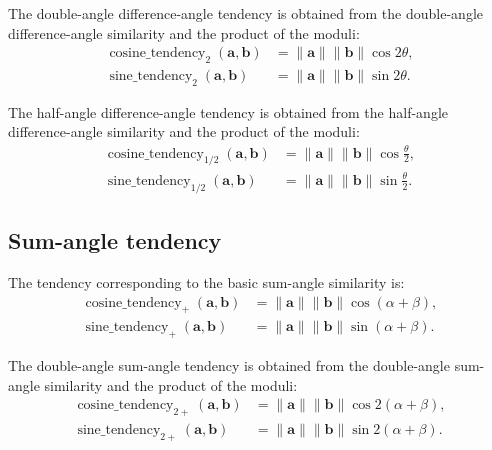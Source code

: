 \begin{definition}\label{def:double_diff_tendency}
The double-angle difference-angle tendency is obtained from the double-angle difference-angle similarity and the product of the moduli:
\begin{align*}
\operatorname{cosine\_tendency}_2(\mathbf{a}, \mathbf{b}) &= \|\mathbf{a}\| \|\mathbf{b}\| \cos 2\theta, \\
\operatorname{sine\_tendency}_2(\mathbf{a}, \mathbf{b}) &= \|\mathbf{a}\| \|\mathbf{b}\| \sin 2\theta.
\end{align*}
\end{definition}

\begin{definition}\label{def:half_diff_tendency}
The half-angle difference-angle tendency is obtained from the half-angle difference-angle similarity and the product of the moduli:
\begin{align*}
\operatorname{cosine\_tendency}_{1/2}(\mathbf{a}, \mathbf{b}) &= \|\mathbf{a}\| \|\mathbf{b}\| \cos\frac{\theta}{2}, \\
\operatorname{sine\_tendency}_{1/2}(\mathbf{a}, \mathbf{b}) &= \|\mathbf{a}\| \|\mathbf{b}\| \sin\frac{\theta}{2}.
\end{align*}
\end{definition}

\subsection{\texorpdfstring{Sum-angle tendency}{Sum-angle tendency}}

\begin{definition}\label{def:basic_sum_tendency}
The tendency corresponding to the basic sum-angle similarity is:
\begin{align*}
\operatorname{cosine\_tendency}_+(\mathbf{a}, \mathbf{b}) &= \|\mathbf{a}\| \|\mathbf{b}\| \cos(\alpha + \beta), \\
\operatorname{sine\_tendency}_+(\mathbf{a}, \mathbf{b}) &= \|\mathbf{a}\| \|\mathbf{b}\| \sin(\alpha + \beta).
\end{align*}
\end{definition}

\begin{definition}\label{def:double_sum_tendency}
The double-angle sum-angle tendency is obtained from the double-angle sum-angle similarity and the product of the moduli:
\begin{align*}
\operatorname{cosine\_tendency}_{2+}(\mathbf{a}, \mathbf{b}) &= \|\mathbf{a}\| \|\mathbf{b}\| \cos 2(\alpha + \beta), \\
\operatorname{sine\_tendency}_{2+}(\mathbf{a}, \mathbf{b}) &= \|\mathbf{a}\| \|\mathbf{b}\| \sin 2(\alpha + \beta).
\end{align*}
\end{definition}

